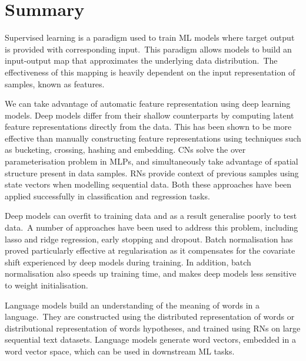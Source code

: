 
\section{Summary}

Supervised learning is a paradigm used to train ML models where target output is provided with corresponding input.\ This paradigm allows models to build an input-output map that approximates the underlying data distribution.\ The effectiveness of this mapping is heavily dependent on the input representation of samples, known as features. \par

\noindent We can take advantage of automatic feature representation using deep learning models. Deep models differ from their shallow counterparts by computing latent feature representations directly from the data. This has been shown to be more effective than manually constructing feature representations using techniques such as bucketing, crossing, hashing and embedding. CNs solve the over parameterisation problem in MLPs, and simultaneously take advantage of spatial structure present in data samples. RNs provide context of previous samples using state vectors when modelling sequential data. Both these approaches have been applied successfully in classification and regression tasks. \par

\noindent Deep models can overfit to training data and as a result generalise poorly to test data.\ A number of approaches have been used to address this problem, including lasso and ridge regression, early stopping and dropout. Batch normalisation has proved particularly effective at regularisation as it compensates for the covariate shift experienced by deep models during training. In addition, batch normalisation also speeds up training time, and makes deep models less sensitive to weight initialisation. \par

\noindent Language models build an understanding of the meaning of words in a language.\ They are constructed using the distributed representation of words or distributional representation of words hypotheses, and trained using RNs on large sequential text datasets. Language models generate word vectors, embedded in a word vector space, which can be used in downstream ML tasks. 
